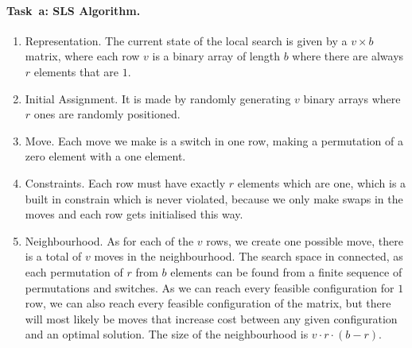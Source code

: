 \paragraph{Task~a: SLS Algorithm.}
\begin{enumerate}
\item Representation. 
The current state of the local search is given by a $v \times b$ matrix, where each row $v$ is a binary array of length $b$ where there are always $r$ elements that are $1$. 

  
\item Initial Assignment. It is made by randomly generating $v$ binary arrays where $r$ ones are randomly positioned. %
\item Move. Each move we make is a switch in one row, making a permutation of a zero element with a one element.
\item Constraints. Each row must have exactly $r$ elements which are one, which is a built in constrain which is never violated, because we only make swaps in the moves and each row gets initialised this way. 
\item Neighbourhood. As for each of the $v$ rows, we create one possible move, there is a total of $v$ moves in the neighbourhood. The search space in connected, as each permutation of $r$ from $b$ elements can be found from a finite sequence of permutations and switches. As we can reach every feasible configuration for $1$ row, we can also reach every feasible configuration of the matrix, but there will most likely be moves that increase cost between any given configuration and an optimal solution. The size of the neighbourhood is $v\cdot r \cdot (b-r)$. 

\end{enumerate}
